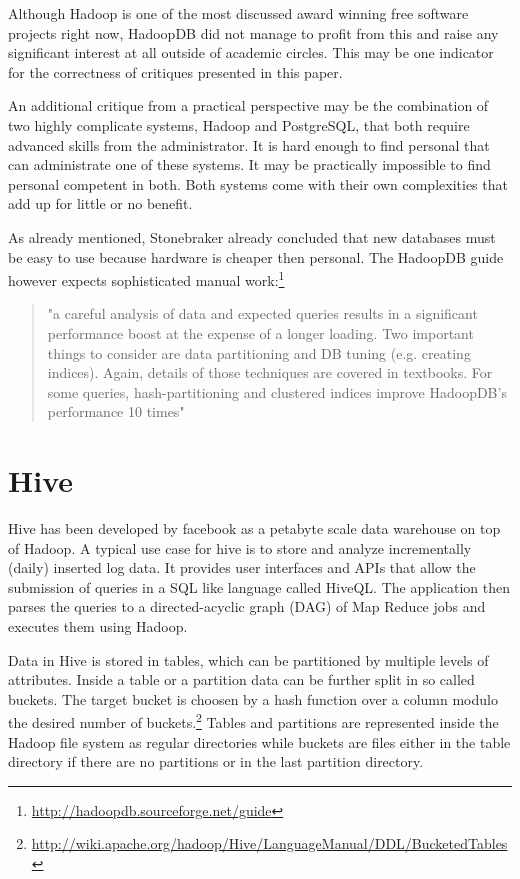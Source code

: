 \documentclass[12pt,a4paper]{scrartcl}		%
\begin{document}
Although Hadoop is one of the most discussed award winning free software projects right now, HadoopDB did not manage to profit from this and raise any significant interest at all outside of academic circles. This may be one indicator for the correctness of critiques presented in this paper.

An additional critique from a practical perspective may be the combination of two highly complicate systems, Hadoop and PostgreSQL, that both require advanced skills from the administrator. It is hard enough to find personal that can administrate one of these systems. It may be practically impossible to find personal competent in both. Both systems come with their own complexities that add up for little or no benefit.

As already mentioned, Stonebraker already concluded that new databases must be easy to use because hardware is cheaper then personal. The HadoopDB guide however expects sophisticated manual work:\footnote{\url{http://hadoopdb.sourceforge.net/guide}}
\begin{quote}
"a careful analysis of data and expected queries results in a significant performance boost at the expense of a longer loading. Two important things to consider are data partitioning and DB tuning (e.g. creating indices). Again, details of those techniques are covered in textbooks. For some queries, hash-partitioning and clustered indices improve HadoopDB's performance 10 times"  
\end{quote}


\section{Hive}

Hive has been developed by facebook as a petabyte scale data warehouse on top of Hadoop.\cite{Thusoo_hive-a} A typical use case for hive is to store and analyze incrementally (daily) inserted log data. It provides user interfaces and APIs that allow the submission of queries in a SQL like language called HiveQL. The application then parses the queries to a directed-acyclic graph (DAG) of Map Reduce jobs and executes them using Hadoop.

Data in Hive is stored in tables, which can be partitioned by multiple levels of attributes. Inside a table or a partition data can be further split in so called buckets. The target bucket is choosen by a hash function over a column modulo the desired number of buckets.\footnote{\url{http://wiki.apache.org/hadoop/Hive/LanguageManual/DDL/BucketedTables}} Tables and partitions are represented inside the Hadoop file system as regular directories while buckets are files either in the table directory if there are no partitions or in the last partition directory.
\end{document}
